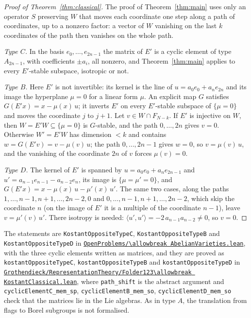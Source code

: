 \documentclass[11pt,a4paper]{amsart}
\theoremstyle{definition}
\theoremstyle{remark}
\newcommand{\leanrepo}{https://github.com/Commutator-IO/GrothendieckArchivesProofs/blob/main}
\begin{document}
\begin{proof}[Proof of Theorem~\ref{thm:classical}]
The proof of Theorem~\ref{thm:main} uses only an operator $S$ preserving $W$ that moves each coordinate one step along a path of coordinates, up to a nonzero factor: a vector of $W$ vanishing on the last $k$ coordinates of the path then vanishes on the whole path.

\emph{Type $C$.} In the basis $e_0,\dots,e_{2n-1}$ the matrix of $E'$ is a cyclic element of type $A_{2n-1}$, with coefficients $\pm a_i$, all nonzero, and Theorem~\ref{thm:main} applies to every $E'$-stable subspace, isotropic or not.

\emph{Type $B$.} Here $E'$ is not invertible: its kernel is the line of $u = a_0 e_0 + a_n e_{2n}$ and its image the hyperplane $\mu = 0$ for a linear form $\mu$. An explicit map $G$ satisfies $G(E'x) = x - \mu(x)\,u$; it inverts $E'$ on every $E'$-stable subspace of $\{\mu = 0\}$ and moves the coordinate $j$ to $j+1$. Let $v \in W \cap F_{N-k}$. If $E'$ is injective on $W$, then $W = E'W \subseteq \{\mu = 0\}$ is $G$-stable, and the path $0, \dots, 2n$ gives $v = 0$. Otherwise $W' = E'W$ has dimension $< k$ and contains $w = G(E'v) = v - \mu(v)\,u$; the path $0, \dots, 2n-1$ gives $w = 0$, so $v = \mu(v)\,u$, and the vanishing of the coordinate $2n$ of $v$ forces $\mu(v) = 0$.

\emph{Type $D$.} The kernel of $E'$ is spanned by $u = a_0 e_0 + a_n e_{2n-1}$ and $u' = a_{n-1} e_{n-1} - a_{n-2} e_n$, its image is $\{\mu = \mu' = 0\}$, and $G(E'x) = x - \mu(x)\,u - \mu'(x)\,u'$. The same two cases, along the paths $1, \dots, n-1, n+1, \dots, 2n-2, 0$ and $0, \dots, n-1, n+1, \dots, 2n-2$, which skip the coordinate $n$ (on the image of $E'$ it is a multiple of the coordinate $n-1$), leave $v = \mu'(v)\,u'$. There isotropy is needed: $\langle u', u' \rangle = -2\,a_{n-1}a_{n-2} \neq 0$, so $v = 0$.
\end{proof}

{\raggedright The statements are \texttt{KostantOppositeTypeC}, \texttt{KostantOppositeTypeB} and \texttt{KostantOppositeTypeD} in \href{\leanrepo/OpenProblems/AbelianVarieties.lean}{\nolinkurl{OpenProblems/\allowbreak AbelianVarieties.lean}}, with the three cyclic elements written as matrices, and they are proved as \texttt{kostantOppositeTypeC}, \texttt{kostantOppositeTypeB} and \texttt{kostantOppositeTypeD} in \href{\leanrepo/Grothendieck/RepresentationTheory/Folder123KostantClassical.lean}{\nolinkurl{Grothendieck/RepresentationTheory/Folder123\allowbreak KostantClassical.lean}}, where \texttt{path\_shift} is the abstract argument and \texttt{cyclicElementC\_mem\_sp}, \texttt{cyclicElementB\_mem\_so}, \texttt{cyclicElementD\_mem\_so} check that the matrices lie in the Lie algebras. As in type $A$, the translation from flags to Borel subgroups is not formalised.\par}
\end{document}
